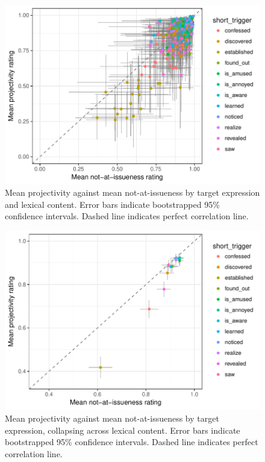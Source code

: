 \documentclass[11pt,fleqn]{article}
\newcommand{\6}{\mbox{$[\hspace*{-.6mm}[$}}
\newcommand{\9}{\mbox{$]\hspace*{-.6mm}]$}}
\begin{document}
\begin{figure}[!h]

\begin{center}
\includegraphics[width=12cm]{../results/exp1b/graphs/ai-proj-bytrigger-bycontent}
\end{center}

\caption{Mean projectivity against mean not-at-issueness by target expression and lexical content. Error bars indicate bootstrapped 95\% confidence intervals. Dashed line indicates perfect correlation line.}
\label{fig:f-proj-ai-1b}
\end{figure}

\begin{figure}[!h]

\begin{center}
\includegraphics[width=12cm]{../results/exp1b/graphs/ai-proj-bytrigger}
\end{center}

\caption{Mean projectivity against mean not-at-issueness by target expression, collapsing across lexical content. Error bars indicate bootstrapped 95\% confidence intervals. Dashed line indicates perfect correlation line.}
\label{fig:f-proj-ai-trigg-1b}
\end{figure}
\end{document}

